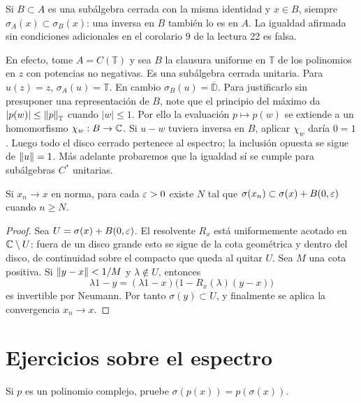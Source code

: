 \begin{observacion}\label{v3:fallo-permanencia}
Si $B\subset A$ es una subálgebra cerrada con la misma identidad y $x\in B$, siempre $\sigma_A(x)\subset\sigma_B(x)$: una inversa en $B$ también lo es en $A$. La igualdad afirmada sin condiciones adicionales en el corolario 9 de la lectura 22 es falsa.

En efecto, tome $A=C(\mathbb T)$ y sea $B$ la clausura uniforme en $\mathbb T$ de los polinomios en $z$ con potencias no negativas. Es una subálgebra cerrada unitaria. Para $u(z)=z$, $\sigma_A(u)=\mathbb T$. En cambio $\sigma_B(u)=\overline{\mathbb D}$. Para justificarlo sin presuponer una representación de $B$, note que el principio del máximo da $|p(w)|\le\left\lVert p\right\rVert_{\mathbb T}$ cuando $|w|\le1$. Por ello la evaluación $p\mapsto p(w)$ se extiende a un homomorfismo $\chi_w:B\to\mathbb C$. Si $u-w$ tuviera inversa en $B$, aplicar $\chi_w$ daría $0=1$. Luego todo el disco cerrado pertenece al espectro; la inclusión opuesta se sigue de $\left\lVert u\right\rVert=1$. Más adelante probaremos que la igualdad sí se cumple para subálgebras $C^*$ unitarias.
\end{observacion}

\begin{teorema}\label{v3:semicontinuidad-espectro}
Si $x_n\to x$ en norma, para cada $\varepsilon>0$ existe $N$ tal que
$\sigma(x_n)\subset\sigma(x)+B(0,\varepsilon)$ cuando $n\ge N$.
\end{teorema}
\begin{proof}
Sea $U=\sigma(x)+B(0,\varepsilon)$. El resolvente $R_x$ está uniformemente acotado en $\mathbb C\setminus U$: fuera de un disco grande esto se sigue de la cota geométrica y dentro del disco, de continuidad sobre el compacto que queda al quitar $U$. Sea $M$ una cota positiva. Si $\left\lVert y-x\right\rVert<1/M$ y $\lambda\notin U$, entonces
\[
 \lambda1-y=(\lambda1-x)\bigl(1-R_x(\lambda)(y-x)\bigr)
\]
es invertible por Neumann. Por tanto $\sigma(y)\subset U$, y finalmente se aplica la convergencia $x_n\to x$.
\end{proof}

\section{Ejercicios sobre el espectro}

\begin{ejercicio}\label{ej:v3-l22-1}
Si $p$ es un polinomio complejo, pruebe $\sigma(p(x))=p(\sigma(x))$.
\end{ejercicio}


